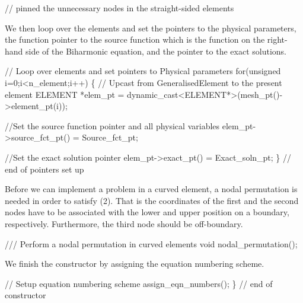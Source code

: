  
\begin{DoxyCodeInclude}
   \textcolor{comment}{// pinned the unnecessary nodes in the straight-sided elements}

\end{DoxyCodeInclude}


We then loop over the elements and set the pointers to the physical parameters, the function pointer to the source function which is the function on the right-\/hand side of the Biharmonic equation, and the pointer to the exact solutions.

 
\begin{DoxyCodeInclude}
 \textcolor{comment}{// Loop over elements and set pointers to Physical parameters}
 \textcolor{keywordflow}{for}(\textcolor{keywordtype}{unsigned} i=0;i<n\_element;i++)
  \{
   \textcolor{comment}{// Upcast from GeneralisedElement to the present element}
   ELEMENT *elem\_pt = \textcolor{keyword}{dynamic\_cast<}ELEMENT*\textcolor{keyword}{>}(mesh\_pt()->element\_pt(i));
   
   \textcolor{comment}{//Set the source function pointer and all physical variables}
   elem\_pt->source\_fct\_pt() = Source\_fct\_pt;
   
   \textcolor{comment}{//Set the exact solution pointer}
   elem\_pt->exact\_pt() = Exact\_soln\_pt;
  \} \textcolor{comment}{// end of pointers set up}

\end{DoxyCodeInclude}


Before we can implement a problem in a curved element, a nodal permutation is needed in order to satisfy (2). That is the coordinates of the first and the second nodes have to be associated with the lower and upper position on a boundary, respectively. Furthermore, the third node should be off-\/boundary.

 
\begin{DoxyCodeInclude}
 \textcolor{comment}{/// Perform a nodal permutation in curved elements}
 \textcolor{keywordtype}{void} nodal\_permutation();

\end{DoxyCodeInclude}


We finish the constructor by assigning the equation numbering scheme.  
\begin{DoxyCodeInclude}
 \textcolor{comment}{// Setup equation numbering scheme}
 assign\_eqn\_numbers();
\} \textcolor{comment}{// end of constructor}

\end{DoxyCodeInclude}





